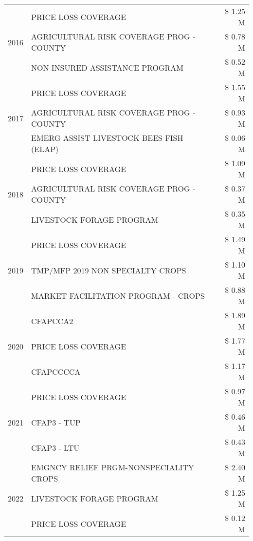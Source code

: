 \begin{tabular}{llr}
\cline{1-3}
\multirow[t]{3}{*}{2016} & PRICE LOSS COVERAGE & \$ 1.25 M \\
 & AGRICULTURAL RISK COVERAGE PROG - COUNTY & \$ 0.78 M \\
 & NON-INSURED ASSISTANCE PROGRAM & \$ 0.52 M \\
\cline{1-3}
\multirow[t]{3}{*}{2017} & PRICE LOSS COVERAGE & \$ 1.55 M \\
 & AGRICULTURAL RISK COVERAGE PROG - COUNTY & \$ 0.93 M \\
 & EMERG ASSIST LIVESTOCK BEES FISH (ELAP) & \$ 0.06 M \\
\cline{1-3}
\multirow[t]{3}{*}{2018} & PRICE LOSS COVERAGE & \$ 1.09 M \\
 & AGRICULTURAL RISK COVERAGE PROG - COUNTY & \$ 0.37 M \\
 & LIVESTOCK FORAGE PROGRAM & \$ 0.35 M \\
\cline{1-3}
\multirow[t]{3}{*}{2019} & PRICE LOSS COVERAGE & \$ 1.49 M \\
 & TMP/MFP 2019 NON SPECIALTY CROPS & \$ 1.10 M \\
 & MARKET FACILITATION PROGRAM - CROPS & \$ 0.88 M \\
\cline{1-3}
\multirow[t]{3}{*}{2020} & CFAPCCA2 & \$ 1.89 M \\
 & PRICE LOSS COVERAGE & \$ 1.77 M \\
 & CFAPCCCCA & \$ 1.17 M \\
\cline{1-3}
\multirow[t]{3}{*}{2021} & PRICE LOSS COVERAGE & \$ 0.97 M \\
 & CFAP3 - TUP & \$ 0.46 M \\
 & CFAP3 - LTU & \$ 0.43 M \\
\cline{1-3}
\multirow[t]{3}{*}{2022} & EMGNCY RELIEF PRGM-NONSPECIALITY CROPS & \$ 2.40 M \\
 & LIVESTOCK FORAGE PROGRAM & \$ 1.25 M \\
 & PRICE LOSS COVERAGE & \$ 0.12 M \\
\cline{1-3}
\bottomrule
\end{tabular}
